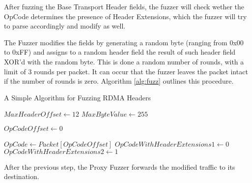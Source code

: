 After fuzzing the Base Transport Header fields, the fuzzer will check wether the OpCode determines the presence of Header Extensions,
which the fuzzer will try to parse accordingly and modify as well.

The Fuzzer modifies the fields by generating a random byte (ranging from 0x00 to 0xFF) and
assigns to a random header field the result of such header field XOR'd with the random byte. This is done a random number
of rounds, with a limit of 3 rounds per packet. It can occur that the fuzzer leaves the packet intact if the number of rounds is zero.
Algorithm \ref{alg:fuzz} outlines this procedure.

\SetAlgoVlined
\begin{algorithm}[t]
  \caption{A Simple Algorithm for Fuzzing RDMA Headers}
  \label{alg:fuzz}
  \LinesNumberedHidden
  \DontPrintSemicolon
  $MaxHeaderOffset \gets 12$\;
  $MaxByteValue \gets 255$\;

  $OpCodeOffset \gets 0$\;

  $OpCode \gets Packet[OpCodeOffset]$\;
  $OpCodeWithHeaderExtensions1 \gets 0$\;
  $OpCodeWithHeaderExtensions2 \gets 1$\;

\end{algorithm}

After the previous step, the Proxy Fuzzer forwards the modified traffic to its destination.



